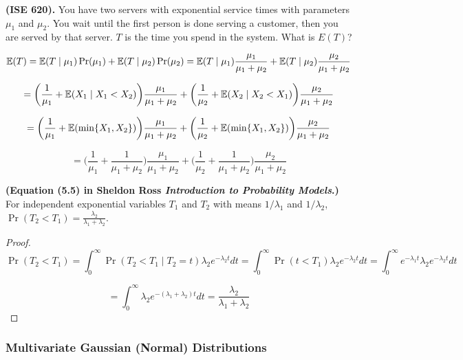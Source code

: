 \begin{example} \textbf{(ISE 620).} You have two servers with exponential service times with parameters \(\mu_1\) and \(\mu_2\). You wait until the first person is done serving a customer, then you are served by that server. \(T\) is the time you spend in the system. What is \(E(T)\)?

\[
\E(T) = \E(T \mid \mu_1) \Pr(\mu_1) + \E(T \mid \mu_2) \Pr(\mu_2) = \E(T \mid \mu_1) \frac{\mu_1}{\mu_1 + \mu_2} + \E(T \mid \mu_2) \frac{\mu_2}{\mu_1 + \mu_2} 
\]

\[
= \bigg( \frac{1}{\mu_1} + \E(X_1 \mid X_1 < X_2) \bigg) \frac{\mu_1}{\mu_1 + \mu_2} +   \bigg( \frac{1}{\mu_2} +  \E(X_2 \mid X_2 < X_1)  \bigg) \frac{\mu_2}{\mu_1 + \mu_2} 
\]

\[
= \bigg( \frac{1}{\mu_1} + \E(\min \{X_1, X_2\} ) \bigg) \frac{\mu_1}{\mu_1 + \mu_2} +   \bigg( \frac{1}{\mu_2} +  \E(\min \{X_1, X_2\} )  \bigg) \frac{\mu_2}{\mu_1 + \mu_2} 
\]

\[
= \bigg( \frac{1}{\mu_1} + \frac{1}{\mu_1 + \mu_2} \bigg) \frac{\mu_1}{\mu_1 + \mu_2} +   \bigg( \frac{1}{\mu_2} + \frac{1}{\mu_1 + \mu_2}   \bigg) \frac{\mu_2}{\mu_1 + \mu_2} 
\]

\end{example}

\begin{proposition} \textbf{(Equation (5.5) in Sheldon Ross \textit{Introduction to Probability Models}.)} For independent exponential variables \(T_1\) and \(T_2\) with means \(1/\lambda_1\) and \(1/\lambda_2\), \(\Pr(T_2 < T_1) =  \frac{\lambda_2}{\lambda_1 + \lambda_2}\).

\end{proposition}

\begin{proof}

\[
\Pr(T_2 < T_1) = \int_0^\infty \Pr(T_2 < T_1 \mid T_2 = t)\lambda_2 e^{-\lambda_2 t} dt = \int_0^\infty \Pr(t < T_1) \lambda_2 e^{-\lambda_2t} dt = \int_0^\infty e^{-\lambda_1t} \lambda_2 e^{-\lambda_2 t} dt 
\]

\[
= \int_0^\infty \lambda_2e^{-(\lambda_1 + \lambda_2)t} dt = \frac{\lambda_2}{\lambda_1 + \lambda_2}
\]

\end{proof}


\subsubsection{Multivariate Gaussian (Normal) Distributions}

